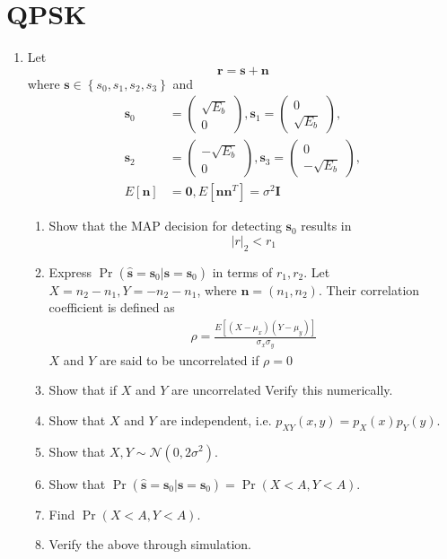 \documentclass[journal,10pt,twocolumn]{IEEEtran}
\providecommand{\pr}[1]{\ensuremath{\Pr\left(#1\right)}}
\providecommand{\sbrak}[1]{\ensuremath{{}\left[#1\right]}}
\providecommand{\brak}[1]{\ensuremath{\left(#1\right)}}
\providecommand{\cbrak}[1]{\ensuremath{\left\{#1\right\}}}
\providecommand{\abs}[1]{\left\vert#1\right\vert}
\newcommand{\myvec}[1]{\ensuremath{\begin{pmatrix}#1\end{pmatrix}}}
\begin{document}
\section{QPSK}
\begin{enumerate}
\item
Let
\begin{equation}
\mathbf{r} = \mathbf{s}+ \mathbf{n}
\end{equation}
where $\mathbf{s} \in \cbrak{s_0,s_1,s_2, s_3}$ and
\begin{align}
\mathbf{s}_0 &= 
\myvec{
\sqrt{E_b}\\
0
},
\mathbf{s}_1 = 
\myvec{
0\\
\sqrt{E_b}
},
\\
\mathbf{s}_2 &= 
\myvec{
-\sqrt{E_b}\\
0
},
\mathbf{s}_3 = 
\myvec{
0\\
-\sqrt{E_b}
},
\\
E\sbrak{\mathbf{n}} &= \mathbf{0}, E\sbrak{\mathbf{n}\mathbf{n}^T} = \sigma^2 \mathbf{I}
\end{align}
%
\begin{enumerate}[label=(\alph{enumii})]
\item Show that the MAP decision for detecting $\mathbf{s}_0$ results in
\begin{equation}
\abs{r}_2 < r_1
\end{equation}
\item Express $\pr{\hat{\mathbf{s}} = \mathbf{s}_0|\mathbf{s} = \mathbf{s}_0}$ in terms of $r_1, r_2$.
Let $X=n_2-n_1, Y = -n_2-n_1$, where $\mathbf{n}=\brak{n_1,n_2}$.
Their correlation coefficient is defined as
%
\begin{align}
\rho = \frac{E\sbrak{\brak{X-\mu_x}\brak{Y-\mu_y}}}{\sigma_x\sigma_y}
\end{align}
%
$X$ and $Y$ are said to be uncorrelated if $\rho = 0$
\item Show that if $X$ and $Y$ are uncorrelated 
Verify this numerically.
\item Show that $X$ and $Y$ are independent, i.e. $p_{XY}(x,y) = p_{X}(x)p_{Y}(y)$.
\item Show that $X,Y \sim \mathcal{N}\brak{0,2\sigma^2}$.
\item Show that $\pr{\hat{\mathbf{s}} = \mathbf{s}_0|\mathbf{s} = \mathbf{s}_0} =\pr{ X < A,  Y < A}$.
\item Find $\pr{ X < A,  Y < A}$.
\item Verify the above through simulation.
\end{enumerate}
\end{enumerate}
\end{document}
